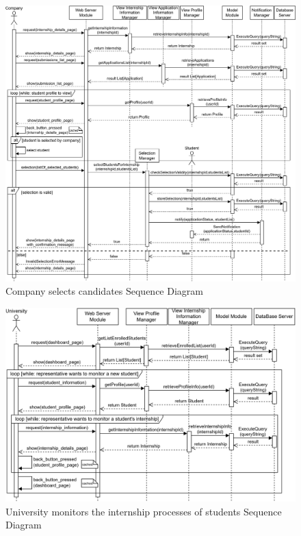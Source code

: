 \begin{figure}[H]
    \centering
    \includegraphics[width=1\textwidth]{Images/Runtime_view/select_SD.png}
    \caption{Company selects candidates Sequence Diagram}
\end{figure}
\begin{figure}[H]
    \centering
    \includegraphics[width=1\textwidth]{Images/Runtime_view/monitor_SD.png}
    \caption{University monitors the internship processes of students Sequence Diagram}
\end{figure}


